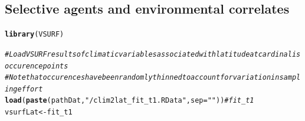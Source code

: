 \documentclass[11pt, oneside]{article}\usepackage[]{graphicx}\usepackage[]{color}
\makeatletter
\newcommand{\hlstr}[1]{\textcolor[rgb]{0.192,0.494,0.8}{#1}}%
\newcommand{\hlcom}[1]{\textcolor[rgb]{0.678,0.584,0.686}{\textit{#1}}}%
\newcommand{\hlstd}[1]{\textcolor[rgb]{0.345,0.345,0.345}{#1}}%
\newcommand{\hlkwb}[1]{\textcolor[rgb]{0.69,0.353,0.396}{#1}}%
\newcommand{\hlkwc}[1]{\textcolor[rgb]{0.333,0.667,0.333}{#1}}%
\newcommand{\hlkwd}[1]{\textcolor[rgb]{0.737,0.353,0.396}{\textbf{#1}}}%
\newenvironment{kframe}{%
 \def\at@end@of@kframe{}%
 \ifinner\ifhmode%
  \def\at@end@of@kframe{\end{minipage}}%
  \begin{minipage}{\columnwidth}%
 \fi\fi%
 \def\FrameCommand##1{\hskip\@totalleftmargin \hskip-\fboxsep
 \colorbox{shadecolor}{##1}\hskip-\fboxsep
     \hskip-\linewidth \hskip-\@totalleftmargin \hskip\columnwidth}%
 \MakeFramed {\advance\hsize-\width
   \@totalleftmargin\z@ \linewidth\hsize
   \@setminipage}}%
 {\par\unskip\endMakeFramed%
 \at@end@of@kframe}
\newenvironment{knitrout}{}{} %
\makeatother
\begin{document}
\subsection*{Selective agents and environmental correlates}

\begin{knitrout}
\color{fgcolor}\begin{kframe}
\begin{alltt}
\hlkwd{library}\hlstd{(VSURF)}
\end{alltt}


{\ttfamily\noindent\itshape\color{messagecolor}{\#\# Loading required package: randomForest\\\#\# randomForest 4.6-10\\\#\# Type rfNews() to see new features/changes/bug fixes.\\\#\# Loading required package: rpart\\\#\# Loading required package: doParallel\\\#\# Loading required package: foreach\\\#\# Loading required package: iterators\\\#\# Loading required package: parallel}}\begin{alltt}
  \hlcom{# Load VSURF results of climatic variables associated with latitude at cardinalis occurence points}
  \hlcom{# Note that occurences have been randomly thinned to account for variation in sampling effort}
  \hlkwd{load}\hlstd{(}\hlkwd{paste}\hlstd{(pathDat,} \hlstr{"/clim2lat_fit_t1.RData"}\hlstd{,} \hlkwc{sep} \hlstd{=} \hlstr{""}\hlstd{))} \hlcom{# fit_t1}
  \hlstd{vsurfLat} \hlkwb{<-} \hlstd{fit_t1}


\end{alltt}
\end{kframe}
\end{knitrout}
\end{document}
